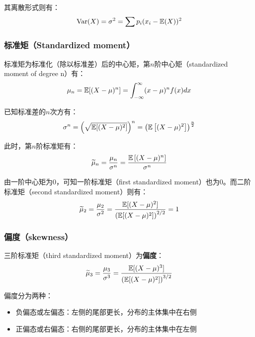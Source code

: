 \documentclass[11pt]{article}
\begin{document}
其离散形式则有：
\begin{equation*}
    \text{Var}(X) = \sigma^2 = \sum p_i (x_i - \mathbb{E}(X))^2 
\end{equation*}

\subsubsection*{标准矩（Standardized moment）}

标准矩为标准化（除以标准差）后的中心矩，第$n$阶中心矩（standardized moment of degree n）有：
\begin{equation*}
    \mu_n = \mathbb{E}[(X-\mu)^n] = \int_{-\infty}^{\infty} (x-\mu)^n f(x)dx
\end{equation*}

已知标准差的$n$次方有：
\begin{equation*}
    \sigma^n = \left(\sqrt{\mathbb{E}[(X-\mu)^2]}\right)^n = \left( \mathbb{E} \left[ (X-\mu)^2\right]\right)^{\frac{n}{2}}
\end{equation*}

此时，第$n$阶标准矩有：
\begin{equation*}
    \widetilde{\mu}_n = \frac{\mu_n}{\sigma^n} = \frac{\mathbb{E}\left[(X-\mu)^n\right]}{\sigma^n}
\end{equation*}

由一阶中心矩为$0$，可知一阶标准矩（first standardized moment）也为$0$。而二阶标准矩（second standardized moment）则有：
\begin{equation*}
    \widetilde{\mu}_2 = \frac{\mu_2}{\sigma^2} = \frac{\mathbb{E}[(X-\mu)^2]}{\left(\mathbb{E}[(X-\mu)^2]\right)^{2/2}} = 1
\end{equation*}

\subsubsection*{偏度（skewness）}

三阶标准矩（third standardized moment）为\textbf{偏度}：
\begin{equation*}
    \widetilde{\mu}_3 = \frac{\mu_3}{\sigma^3} = \frac{\mathbb{E}[(X-\mu)^3]}{\left(\mathbb{E}[(X-\mu)^2]\right)^{3/2}}
\end{equation*}

偏度分为两种：
\begin{itemize}
    \item 负偏态或左偏态：左侧的尾部更长，分布的主体集中在右侧
    \item 正偏态或右偏态：右侧的尾部更长，分布的主体集中在左侧
\end{itemize}
\end{document}
